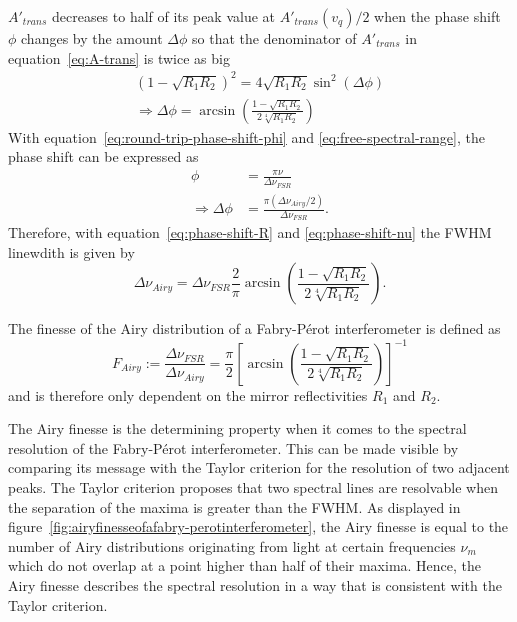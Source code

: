 $A'_{trans}$ decreases to half of its peak value at $A'_{trans}(v_q) / 2$ when the phase shift $\phi$ changes by the amount $\Delta\phi$ so that the denominator of $A'_{trans}$ in equation~\eqref{eq:A-trans}  is twice as big
\begin{align}
\left(1-\sqrt{R_1R_2}\right)^2=4\sqrt{R_1R_2}\sin^2(\Delta\phi) \\
\label{eq:phase-shift-R}
\Rightarrow \Delta\phi=\arcsin\left(\frac{1-\sqrt{R_1R_2}}{2\sqrt[4]{R_1R_2}}\right)
\end{align}
With equation~\eqref{eq:round-trip-phase-shift-phi} and \eqref{eq:free-spectral-range}, the phase shift can be expressed as
\begin{align}
\phi &= \frac{\pi \nu}{\Delta \nu_{FSR}} \\
\label{eq:phase-shift-nu}
\Rightarrow \Delta \phi &= \frac{\pi (\Delta \nu_{Airy}/2)}{\Delta \nu_{FSR}}.
\end{align}
Therefore, with equation~\eqref{eq:phase-shift-R} and \eqref{eq:phase-shift-nu} the FWHM linewdith is given by
\begin{equation}
\Delta \nu_{Airy} = \Delta \nu_{FSR}\frac{2}{\pi}\arcsin\left(\frac{1-\sqrt{R_1R_2}}{2\sqrt[4]{R_1R_2}}\right).
\end{equation}

The finesse of the Airy distribution of a Fabry-Pérot interferometer is defined as
\begin{equation}
\label{eq:f-airy}
F_{Airy} := \frac{\Delta \nu_{FSR}}{\Delta \nu_{Airy}} = \frac{\pi}{2}\left[\arcsin\left(\frac{1-\sqrt{R_1R_2}}{2\sqrt[4]{R_1R_2}}\right)\right]^{-1}
\end{equation}
and is therefore only dependent on the mirror reflectivities $R_1$ and $R_2$.

The Airy finesse is the determining property when it comes to the spectral resolution of the Fabry-Pérot interferometer. This can be made visible by comparing its message with the Taylor criterion for the resolution of two adjacent peaks.
The Taylor criterion proposes that two spectral lines are resolvable when the separation of the maxima is greater than the FWHM. As displayed in figure~\ref{fig:airyfinesseofafabry-perotinterferometer}, the Airy finesse is equal to the number of Airy distributions originating from light at certain frequencies $\nu_m$ which do not overlap at a point higher than half of their maxima.
Hence, the Airy finesse describes the spectral resolution in a way that is consistent with the Taylor criterion.

